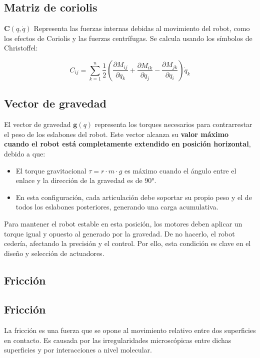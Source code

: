 \subsection{Matriz de coriolis}

\(\mathbf{C}(q,\dot{q}) \)
Representa las fuerzas internas debidas al movimiento del robot, como los efectos de Coriolis y las fuerzas centrífugas. Se calcula usando los símbolos de Christoffel:

\[
C_{ij} = \sum_{k=1}^{n} \frac{1}{2} \left( \frac{\partial M_{ij}}{\partial q_k} + \frac{\partial M_{ik}}{\partial q_j} - \frac{\partial M_{jk}}{\partial q_i} \right) \dot{q}_k
\]


\subsection{Vector de gravedad}


El vector de gravedad \( \mathbf{g}(q) \) representa los torques necesarios para contrarrestar el peso de los eslabones del robot. Este vector alcanza su \textbf{valor máximo cuando el robot está completamente extendido en posición horizontal}, debido a que:

\begin{itemize}
	\item El torque gravitacional \( \tau = r \cdot m \cdot g \) es máximo cuando el ángulo entre el enlace y la dirección de la gravedad es de 90°.
	\item En esta configuración, cada articulación debe soportar su propio peso y el de todos los eslabones posteriores, generando una carga acumulativa.
\end{itemize}

Para mantener el robot estable en esta posición, los motores deben aplicar un torque igual y opuesto al generado por la gravedad. De no hacerlo, el robot cedería, afectando la precisión y el control. Por ello, esta condición es clave en el diseño y selección de actuadores.



\subsection{Fricción}


\subsection*{Fricción}

La fricción es una fuerza que se opone al movimiento relativo entre dos superficies en contacto. Es causada por las irregularidades microscópicas entre dichas superficies y por interacciones a nivel molecular.

